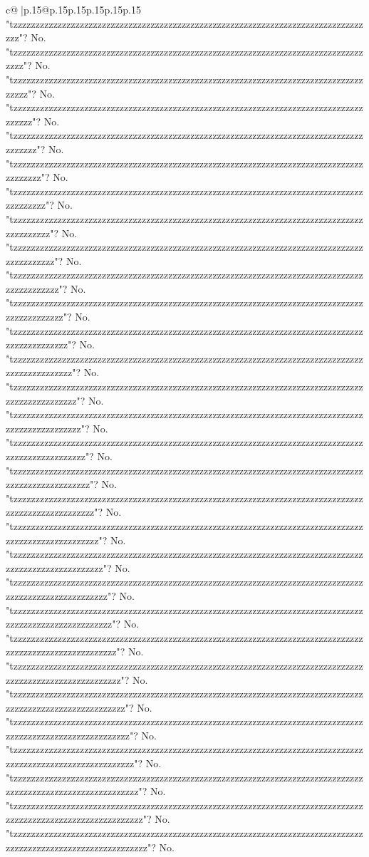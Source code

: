 \documentclass{article}
\begin{document}
{\begin{supertabular}{c@{$\;$}|p{.15\linewidth}@{}p{.15\linewidth}p{.15\linewidth}p{.15\linewidth}p{.15\linewidth}p{.15\linewidth}}
{{{"tzzzzzzzzzzzzzzzzzzzzzzzzzzzzzzzzzzzzzzzzzzzzzzzzzzzzzzzzzzzzzzzzzzzzzzzzzzzzzzzzzz"? No. "tzzzzzzzzzzzzzzzzzzzzzzzzzzzzzzzzzzzzzzzzzzzzzzzzzzzzzzzzzzzzzzzzzzzzzzzzzzzzzzzzzzz"? No. "tzzzzzzzzzzzzzzzzzzzzzzzzzzzzzzzzzzzzzzzzzzzzzzzzzzzzzzzzzzzzzzzzzzzzzzzzzzzzzzzzzzzz"? No. "tzzzzzzzzzzzzzzzzzzzzzzzzzzzzzzzzzzzzzzzzzzzzzzzzzzzzzzzzzzzzzzzzzzzzzzzzzzzzzzzzzzzzz"? No. "tzzzzzzzzzzzzzzzzzzzzzzzzzzzzzzzzzzzzzzzzzzzzzzzzzzzzzzzzzzzzzzzzzzzzzzzzzzzzzzzzzzzzzz"? No. "tzzzzzzzzzzzzzzzzzzzzzzzzzzzzzzzzzzzzzzzzzzzzzzzzzzzzzzzzzzzzzzzzzzzzzzzzzzzzzzzzzzzzzzz"? No. "tzzzzzzzzzzzzzzzzzzzzzzzzzzzzzzzzzzzzzzzzzzzzzzzzzzzzzzzzzzzzzzzzzzzzzzzzzzzzzzzzzzzzzzzz"? No. "tzzzzzzzzzzzzzzzzzzzzzzzzzzzzzzzzzzzzzzzzzzzzzzzzzzzzzzzzzzzzzzzzzzzzzzzzzzzzzzzzzzzzzzzzz"? No. "tzzzzzzzzzzzzzzzzzzzzzzzzzzzzzzzzzzzzzzzzzzzzzzzzzzzzzzzzzzzzzzzzzzzzzzzzzzzzzzzzzzzzzzzzzz"? No. "tzzzzzzzzzzzzzzzzzzzzzzzzzzzzzzzzzzzzzzzzzzzzzzzzzzzzzzzzzzzzzzzzzzzzzzzzzzzzzzzzzzzzzzzzzzz"? No. "tzzzzzzzzzzzzzzzzzzzzzzzzzzzzzzzzzzzzzzzzzzzzzzzzzzzzzzzzzzzzzzzzzzzzzzzzzzzzzzzzzzzzzzzzzzzz"? No. "tzzzzzzzzzzzzzzzzzzzzzzzzzzzzzzzzzzzzzzzzzzzzzzzzzzzzzzzzzzzzzzzzzzzzzzzzzzzzzzzzzzzzzzzzzzzzz"? No. "tzzzzzzzzzzzzzzzzzzzzzzzzzzzzzzzzzzzzzzzzzzzzzzzzzzzzzzzzzzzzzzzzzzzzzzzzzzzzzzzzzzzzzzzzzzzzzz"? No. "tzzzzzzzzzzzzzzzzzzzzzzzzzzzzzzzzzzzzzzzzzzzzzzzzzzzzzzzzzzzzzzzzzzzzzzzzzzzzzzzzzzzzzzzzzzzzzzz"? No. "tzzzzzzzzzzzzzzzzzzzzzzzzzzzzzzzzzzzzzzzzzzzzzzzzzzzzzzzzzzzzzzzzzzzzzzzzzzzzzzzzzzzzzzzzzzzzzzzz"? No. "tzzzzzzzzzzzzzzzzzzzzzzzzzzzzzzzzzzzzzzzzzzzzzzzzzzzzzzzzzzzzzzzzzzzzzzzzzzzzzzzzzzzzzzzzzzzzzzzzz"? No. "tzzzzzzzzzzzzzzzzzzzzzzzzzzzzzzzzzzzzzzzzzzzzzzzzzzzzzzzzzzzzzzzzzzzzzzzzzzzzzzzzzzzzzzzzzzzzzzzzzz"? No. "tzzzzzzzzzzzzzzzzzzzzzzzzzzzzzzzzzzzzzzzzzzzzzzzzzzzzzzzzzzzzzzzzzzzzzzzzzzzzzzzzzzzzzzzzzzzzzzzzzzz"? No. "tzzzzzzzzzzzzzzzzzzzzzzzzzzzzzzzzzzzzzzzzzzzzzzzzzzzzzzzzzzzzzzzzzzzzzzzzzzzzzzzzzzzzzzzzzzzzzzzzzzzz"? No. "tzzzzzzzzzzzzzzzzzzzzzzzzzzzzzzzzzzzzzzzzzzzzzzzzzzzzzzzzzzzzzzzzzzzzzzzzzzzzzzzzzzzzzzzzzzzzzzzzzzzzz"? No. "tzzzzzzzzzzzzzzzzzzzzzzzzzzzzzzzzzzzzzzzzzzzzzzzzzzzzzzzzzzzzzzzzzzzzzzzzzzzzzzzzzzzzzzzzzzzzzzzzzzzzzz"? No. "tzzzzzzzzzzzzzzzzzzzzzzzzzzzzzzzzzzzzzzzzzzzzzzzzzzzzzzzzzzzzzzzzzzzzzzzzzzzzzzzzzzzzzzzzzzzzzzzzzzzzzzz"? No. "tzzzzzzzzzzzzzzzzzzzzzzzzzzzzzzzzzzzzzzzzzzzzzzzzzzzzzzzzzzzzzzzzzzzzzzzzzzzzzzzzzzzzzzzzzzzzzzzzzzzzzzzz"? No. "tzzzzzzzzzzzzzzzzzzzzzzzzzzzzzzzzzzzzzzzzzzzzzzzzzzzzzzzzzzzzzzzzzzzzzzzzzzzzzzzzzzzzzzzzzzzzzzzzzzzzzzzzz"? No. "tzzzzzzzzzzzzzzzzzzzzzzzzzzzzzzzzzzzzzzzzzzzzzzzzzzzzzzzzzzzzzzzzzzzzzzzzzzzzzzzzzzzzzzzzzzzzzzzzzzzzzzzzzz"? No. "tzzzzzzzzzzzzzzzzzzzzzzzzzzzzzzzzzzzzzzzzzzzzzzzzzzzzzzzzzzzzzzzzzzzzzzzzzzzzzzzzzzzzzzzzzzzzzzzzzzzzzzzzzzz"? No. "tzzzzzzzzzzzzzzzzzzzzzzzzzzzzzzzzzzzzzzzzzzzzzzzzzzzzzzzzzzzzzzzzzzzzzzzzzzzzzzzzzzzzzzzzzzzzzzzzzzzzzzzzzzzz"? No. "tzzzzzzzzzzzzzzzzzzzzzzzzzzzzzzzzzzzzzzzzzzzzzzzzzzzzzzzzzzzzzzzzzzzzzzzzzzzzzzzzzzzzzzzzzzzzzzzzzzzzzzzzzzzzz"? No. "tzzzzzzzzzzzzzzzzzzzzzzzzzzzzzzzzzzzzzzzzzzzzzzzzzzzzzzzzzzzzzzzzzzzzzzzzzzzzzzzzzzzzzzzzzzzzzzzzzzzzzzzzzzzzzz"? No. "tzzzzzzzzzzzzzzzzzzzzzzzzzzzzzzzzzzzzzzzzzzzzzzzzzzzzzzzzzzzzzzzzzzzzzzzzzzzzzzzzzzzzzzzzzzzzzzzzzzzzzzzzzzzzzzz"? No. }}}
\end{supertabular}}
\end{document}
